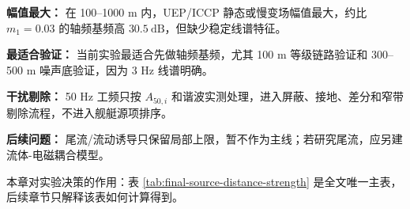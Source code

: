 \textbf{幅值最大：} 在 100--1000 m 内，UEP/ICCP 静态或慢变场幅值最大，约比 $m_1=0.03$ 的轴频基频高 $30.5\ \mathrm{dB}$，但缺少稳定线谱特征。

\textbf{最适合验证：} 当前实验最适合先做轴频基频，尤其 100 m 等级链路验证和 300--500 m 噪声底验证，因为 3 Hz 线谱明确。

\textbf{干扰剔除：} 50 Hz 工频只按 $A_{50,i}$ 和谐波实测处理，进入屏蔽、接地、差分和窄带剔除流程，不进入舰艇源项排序。

\textbf{后续问题：} 尾流/流动诱导只保留局部上限，暂不作为主线；若研究尾流，应另建流体-电磁耦合模型。

本章对实验决策的作用：表 \ref{tab:final-source-distance-strength} 是全文唯一主表，后续章节只解释该表如何计算得到。
